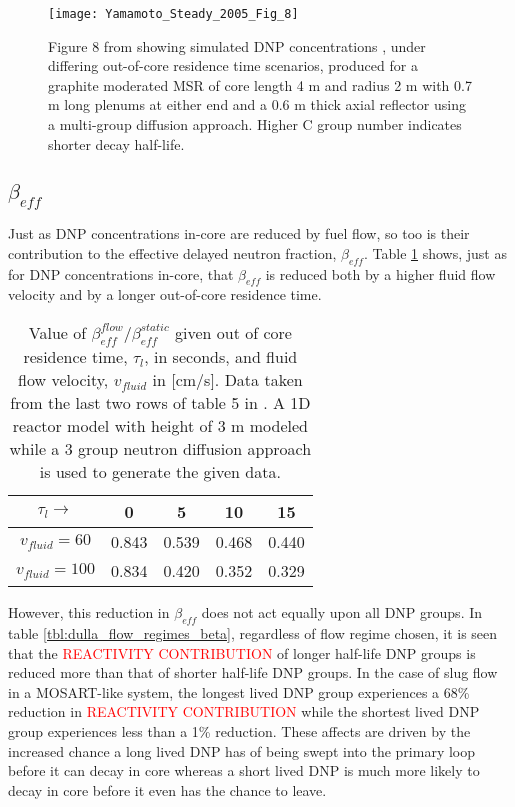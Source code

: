 \documentclass[review]{elsarticle}
\begin{document}
\begin{figure}[h]
   \centering
   \texttt{[image: Yamamoto\_Steady\_2005\_Fig\_8]}
   \caption{Figure 8 from \cite{yamamoto_steady_2005} showing simulated DNP concentrations
    , under differing out-of-core residence time scenarios, produced for
    a graphite moderated MSR of core length 4 m and radius 2 m with 0.7 m long 
    plenums at either end and a 0.6 m thick axial reflector using a
    multi-group diffusion approach. Higher C group number indicates shorter decay half-life.}
   \label{fig:yamamoto_transit_time}
\end{figure}

\subsection{$\beta_{eff}$} \label{ssec:beta}
Just as DNP concentrations in-core are reduced by fuel flow, so too is their
contribution to the effective delayed neutron fraction, $\beta_{eff}$.
Table \ref{tbl:mattioda_beta_reduction} shows, just as for DNP concentrations
in-core, that $\beta_{eff}$ is reduced both by a higher fluid flow velocity and
by a longer out-of-core residence time.

\begin{table}[h]
    \caption{Value of $\beta_{eff}^{flow}/\beta_{eff}^{static}$ given out of
        core residence time, $\tau_{l}$, in seconds, 
        and fluid flow velocity, $v_{fluid}$ in [cm/s]. Data taken from
        the last two rows of table 5
        in \cite{mattioda_effective_2000}. A 1D reactor model with height of 3 m
        modeled while a 3 group neutron diffusion approach is used to generate
        the given data.} 
    \label{tbl:mattioda_beta_reduction}
    \begin{center}
        \begin{tabular}{|c|c|c|c|c|}
            \hline
            $\tau_{l}\rightarrow$ & 0 & 5 & 10 & 15 \\
            \hline
            $v_{fluid} = 60$ & 0.843 & 0.539 & 0.468 & 0.440 \\
            \hline
            $v_{fluid} = 100$ & 0.834 & 0.420 & 0.352 & 0.329 \\
            \hline
        \end{tabular}
    \end{center}
\end{table}

However,
this reduction in $\beta_{eff}$ does not act equally upon all DNP groups. In table
\ref{tbl:dulla_flow_regimes_beta}, regardless of flow regime chosen, it is seen
that the \textcolor{red}{REACTIVITY CONTRIBUTION} of longer half-life DNP groups is
reduced more than that of shorter half-life DNP groups. In the case of slug
flow in a MOSART-like system, the longest lived DNP group experiences a 68\%
reduction in \textcolor{red}{REACTIVITY CONTRIBUTION} while the shortest lived DNP group
experiences less than a 1\% reduction. These affects are driven by the increased
chance a long lived DNP has of being swept into the primary loop before it can
decay in core whereas a short lived DNP is much more likely to decay in core
before it even has the chance to leave.
\end{document}

